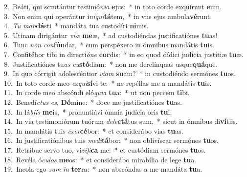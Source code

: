 {2.~}Beáti, qui scrutántur testimó\textit{ni}\textit{a} \textbf{e}jus:~* in toto corde exquírunt \textbf{e}um.\\
{3.~}Non enim qui operántur i\textit{ni}\textit{qui}\textbf{tá}tem,~* in viis ejus ambula\textbf{vé}runt.\\
{4.~}\textit{Tu} \textit{man}\textbf{dá}sti~* mandáta tua custodíri \textbf{ni}mis.\\
{5.~}Utinam dirigántur \textit{vi}\textit{æ} \textbf{me}æ,~* ad custodiéndas justificatiónes \textbf{tu}as!\\
{6.~}Tunc \textit{non} \textit{con}\textbf{fún}dar,~* cum perspéxero in ómnibus mandátis \textbf{tu}is.\\
{7.~}Confitébor tibi in directi\textit{ó}\textit{ne} \textbf{cor}dis:~* in eo quod dídici judícia justítiæ \textbf{tu}æ.\\
{8.~}Justificatiónes tu\textit{as} \textit{cu}\textbf{stó}diam:~* non me derelínquas usque\textbf{quá}que.\\
{9.~}In quo córrigit adolescéntior \textit{vi}\textit{am} \textbf{su}am?~* in custodiéndo sermónes \textbf{tu}os.\\
{10.~}In toto corde meo \textit{ex}\textit{qui}\textbf{sí}vi te:~* ne repéllas me a mandátis \textbf{tu}is.\\
{11.~}In corde meo abscóndi eló\textit{qui}\textit{a} \textbf{tu}a:~* ut non peccem \textbf{ti}bi.\\
{12.~}Benedí\textit{ctus} \textit{es}, \textbf{Dó}mine:~* doce me justificatiónes \textbf{tu}as.\\
{13.~}In lá\textit{bi}\textit{is} \textbf{me}is,~* pronuntiávi ómnia judícia oris \textbf{tu}i.\\
{14.~}In via testimoniórum tuórum \textit{de}\textit{le}\textbf{ctá}tus sum,~* sicut in ómnibus di\textbf{ví}tiis.\\
{15.~}In mandátis tuis \textit{e}\textit{xer}\textbf{cé}bor:~* et considerábo vias \textbf{tu}as.\\
{16.~}In justificatiónibus tuis \textit{me}\textit{di}\textbf{tá}bor:~* non oblivíscar sermónes \textbf{tu}os.\\
{17.~}Retríbue servo tuo, vi\textit{ví}\textit{fi}\textbf{ca} me:~* et custódiam sermónes \textbf{tu}os.\\
{18.~}Revéla ó\textit{cu}\textit{los} \textbf{me}os:~* et considerábo mirabília de lege \textbf{tu}a.\\
{19.~}Incola ego \textit{sum} \textit{in} \textbf{ter}ra:~* non abscóndas a me mandáta \textbf{tu}a.\\
